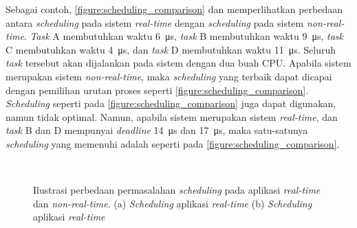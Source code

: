 Sebagai contoh, \autoref{figure:scheduling_comparison} dan  memperlihatkan perbedaan antara \textit{scheduling} pada sistem \textit{real-time} dengan \textit{scheduling} pada sistem \textit{non-real-time}.
\textit{Task} A membutuhkan waktu \SI{6}{\micro\second}, \textit{task} B membutuhkan waktu \SI{9}{\micro\second}, \textit{task} C membutuhkan waktu \SI{4}{\micro\second}, dan \textit{task} D membutuhkan waktu \SI{11}{\micro\second}.
Seluruh \textit{task} tersebut akan dijalankan pada sistem dengan dua buah CPU.
Apabila sistem merupakan sistem \textit{non-real-time}, maka \textit{scheduling} yang terbaik dapat dicapai dengan pemilihan urutan proses seperti \autoref{figure:scheduling_comparison}.
\textit{Scheduling} seperti pada \autoref{figure:scheduling_comparison} juga dapat digunakan, namun tidak optimal.
Namun, apabila sistem merupakan sistem \textit{real-time}, dan \textit{task} B dan D mempunyai \textit{deadline} \SI{14}{\micro\second} dan \SI{17}{\micro\second}, maka satu-satunya \textit{scheduling} yang memenuhi adalah seperti pada \autoref{figure:scheduling_comparison}.

\begin{figure}[htbp]
    \centering
    \vspace{18pt}
    \\
    \vspace{18pt}\hspace{24pt}
    \caption{Ilustrasi perbedaan permasalahan \textit{scheduling} pada aplikasi \textit{real-time} dan \textit{non-real-time}. (a) \textit{Scheduling} aplikasi \textit{real-time} (b) \textit{Scheduling} aplikasi \textit{real-time}}
    \label{figure:scheduling_comparison}
\end{figure}

